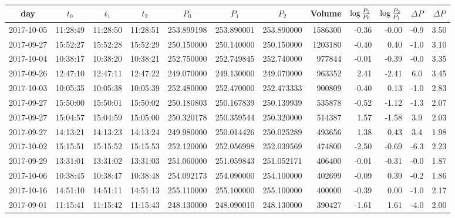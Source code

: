 \begin{table}[htb!]
  \begin{tiny}
    \centering
    \begin{tabular}{|c|c|c|c|c|c|c|r|r|r|c|c|}
      \hline
      day & $t_0$ & $t_1$ & $t_2$ & $P_0$ & $P_1$ & $P_2$ & Volume & $\log {P_1 \over P_0}$ & $\log {P_2 \over P_1}$ & $\Delta P$ & $\overline{\Delta P}$\\
      \hline
      2017-10-05 & 11:28:49 & 11:28:50 & 11:28:51 & 253.899198 & 253.890001 & 253.890000 & 1586300 & -0.36 & -0.00 & -0.9 & 3.50\\
      2017-09-27 & 15:52:27 & 15:52:28 & 15:52:29 & 250.150000 & 250.140000 & 250.150000 & 1203180 & -0.40 & 0.40 & -1.0 & 3.10\\
      2017-10-04 & 10:38:17 & 10:38:20 & 10:38:21 & 252.750000 & 252.749845 & 252.740000 & 977844 & -0.01 & -0.39 & -0.0 & 3.35\\
      2017-09-26 & 12:47:10 & 12:47:11 & 12:47:22 & 249.070000 & 249.130000 & 249.070000 & 963352 & 2.41 & -2.41 & 6.0 & 3.45\\
      2017-10-03 & 10:05:35 & 10:05:38 & 10:05:39 & 252.480000 & 252.470000 & 252.473333 & 900809 & -0.40 & 0.13 & -1.0 & 2.83\\
      2017-09-27 & 15:50:00 & 15:50:01 & 15:50:02 & 250.180803 & 250.167839 & 250.139939 & 535878 & -0.52 & -1.12 & -1.3 & 2.07\\
      2017-09-27 & 15:04:57 & 15:04:59 & 15:05:00 & 250.320178 & 250.359544 & 250.320000 & 514387 & 1.57 & -1.58 & 3.9 & 2.03\\
      2017-09-27 & 14:13:21 & 14:13:23 & 14:13:24 & 249.980000 & 250.014426 & 250.025289 & 493656 & 1.38 & 0.43 & 3.4 & 1.98\\
      2017-10-02 & 15:15:51 & 15:15:52 & 15:15:53 & 252.120000 & 252.056998 & 252.039569 & 474800 & -2.50 & -0.69 & -6.3 & 2.23\\
      2017-09-29 & 13:31:01 & 13:31:02 & 13:31:03 & 251.060000 & 251.059843 & 251.052171 & 406400 & -0.01 & -0.31 & -0.0 & 1.87\\
      2017-10-06 & 10:38:45 & 10:38:47 & 10:38:48 & 254.092173 & 254.090000 & 254.100000 & 402699 & -0.09 & 0.39 & -0.2 & 1.86\\
      2017-10-16 & 14:51:10 & 14:51:11 & 14:51:13 & 255.110000 & 255.100000 & 255.100000 & 400000 & -0.39 & 0.00 & -1.0 & 2.17\\
      2017-09-01 & 11:15:41 & 11:15:42 & 11:15:43 & 248.130000 & 248.090010 & 248.130000 & 390427 & -1.61 & 1.61 & -4.0 & 2.00\\

\end{tabular}
\end{tiny}
\end{table}
